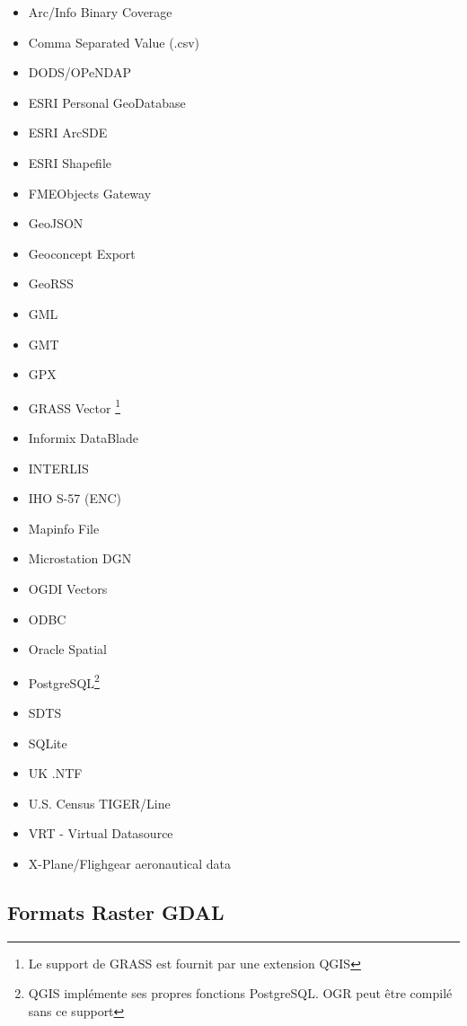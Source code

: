 \begin{itemize}
\item Arc/Info Binary Coverage
\item Comma Separated Value (.csv) 
\item DODS/OPeNDAP
\item ESRI Personal GeoDatabase
\item ESRI ArcSDE
\item ESRI Shapefile
\item FMEObjects Gateway
\item GeoJSON
\item Geoconcept Export
\item GeoRSS
\item GML
\item GMT
\item GPX
\item GRASS Vector \footnote{Le support de GRASS est fournit par une extension QGIS}
\item Informix DataBlade
\item INTERLIS
\item IHO S-57 (ENC)
\item Mapinfo File
\item Microstation DGN
\item OGDI Vectors
\item ODBC
\item Oracle Spatial
\item PostgreSQL\footnote{QGIS implémente ses propres fonctions PostgreSQL. OGR peut être compilé sans ce support}
\item SDTS
\item SQLite
\item UK .NTF
\item U.S. Census TIGER/Line
\item VRT - Virtual Datasource
\item X-Plane/Flighgear aeronautical data
\end{itemize}

\subsection{Formats Raster GDAL}\label{appdx_gdal}

